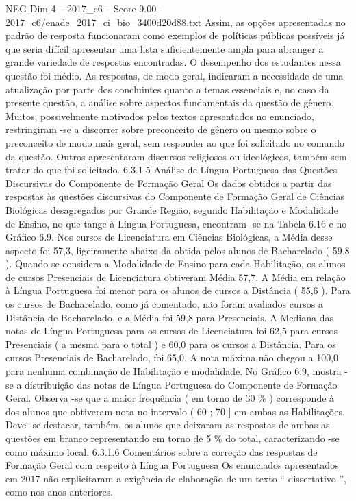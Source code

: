 \begin{textsample}{NEG Dim 4 – 2017\_c6 – Score 9.00 – 2017\_c6/enade\_2017\_ci\_bio\_3400d20d88.txt}
Assim, as opções apresentadas no padrão de resposta funcionaram como exemplos de políticas públicas possíveis já que seria difícil apresentar uma lista suficientemente ampla para abranger a grande variedade de respostas encontradas.
O desempenho dos estudantes nessa questão foi médio.
As respostas, de modo geral, indicaram a necessidade de uma atualização por parte dos concluintes quanto a temas essenciais e, no caso da presente questão, a análise sobre aspectos fundamentais da questão de gênero.
Muitos, possivelmente motivados pelos textos apresentados no enunciado, restringiram -se a discorrer sobre preconceito de gênero ou mesmo sobre o preconceito de modo mais geral, sem responder ao que foi solicitado no comando da questão.
Outros apresentaram discursos religiosos ou ideológicos, também sem tratar do que foi solicitado. 6.3.1.5 Análise de Língua Portuguesa das Questões Discursivas do Componente de Formação Geral Os dados obtidos a partir das respostas às questões discursivas do Componente de Formação Geral de Ciências Biológicas desagregados por Grande Região, segundo Habilitação e Modalidade de Ensino, no que tange à Língua Portuguesa, encontram -se na Tabela 6.16 e no Gráfico 6.9.
Nos cursos de Licenciatura em Ciências Biológicas, a Média desse aspecto foi 57,3, ligeiramente abaixo da obtida pelos alunos de Bacharelado ( 59,8 ).
Quando se considera a Modalidade de Ensino para cada Habilitação, os alunos de cursos Presenciais de Licenciatura obtiveram Média 57,7.
A Média em relação à Língua Portuguesa foi menor para os alunos de cursos a Distância ( 55,6 ).
Para os cursos de Bacharelado, como já comentado, não foram avaliados cursos a Distância de Bacharelado, e a Média foi 59,8 para Presenciais.
A Mediana das notas de Língua Portuguesa para os cursos de Licenciatura foi 62,5 para cursos Presenciais ( a mesma para o total ) e 60,0 para os cursos a Distância.
Para os cursos Presenciais de Bacharelado, foi 65,0.
A nota máxima não chegou a 100,0 para nenhuma combinação de Habilitação e modalidade.
No Gráfico 6.9, mostra -se a distribuição das notas de Língua Portuguesa do Componente de Formação Geral.
Observa -se que a maior frequência ( em torno de 30 \% ) corresponde à dos alunos que obtiveram nota no intervalo ( 60 ; 70 ] em ambas as Habilitações.
Deve -se destacar, também, os alunos que deixaram as respostas de ambas as questões em branco representando em torno de 5 \% do total, caracterizando -se como máximo local. 6.3.1.6 Comentários sobre a correção das respostas de Formação Geral com respeito à Língua Portuguesa Os enunciados apresentados em 2017 não explicitaram a exigência de elaboração de um texto “ dissertativo ”, como nos anos anteriores.

\end{textsample}
